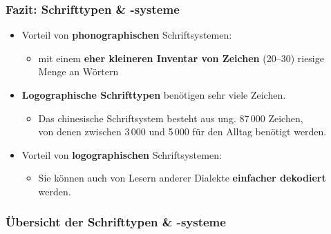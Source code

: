 \begin{frame}
\frametitle{Fazit: Schrifttypen \& -systeme}

\begin{itemize}
	\item Vorteil von \textbf{phonographischen} Schriftsystemen:
	
	\begin{itemize}
		\item mit einem \textbf{eher kleineren Inventar von Zeichen} (20--30) \ras riesige Menge an Wörtern
	\end{itemize}
	
	\item \textbf{Logographische Schrifttypen} benötigen sehr viele Zeichen.
	
	\begin{itemize}
		\item Das chinesische Schriftsystem besteht aus ung. 87\,000 Zeichen,\\
                  von denen zwischen 3\,000 und 5\,000 für den Alltag benötigt werden.
	\end{itemize}
	
\pause 	

	\item Vorteil von \textbf{logographischen} Schriftsystemen:
	\begin{itemize}
		\item Sie können auch von Lesern anderer Dialekte \textbf{einfacher dekodiert} werden.
	\end{itemize}	
\end{itemize}
\end{frame}


\begin{frame}
\frametitle{Übersicht der Schrifttypen \& -systeme}


\begin{figure}
\centering
{}
\end{figure}

\end{frame}


